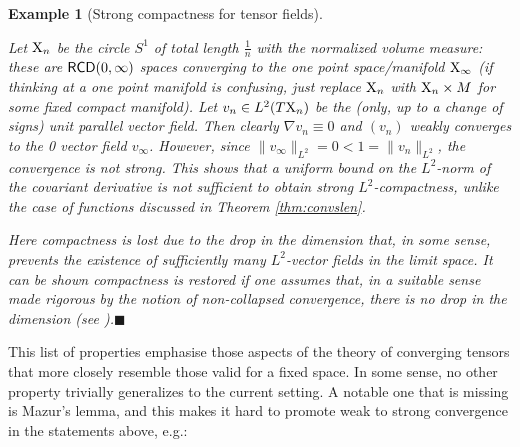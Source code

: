 \documentclass[11pt]{article}
\numberwithin{equation}{section}
\newtheorem{example}[theorem]{Example}
\newcommand{\X}{{\rm X}}
\newcommand{\RCD}{{\sf RCD}}
\newcommand{\fr}{\penalty-20\null\hfill$\blacksquare$}         %
\begin{document}
\begin{example}[Strong compactness for tensor fields]\label{eq:compvect}{\rm Let $\X_n$ be the circle $S^1$ of total length $\tfrac1n$ with the normalized volume measure: these are $\RCD(0,\infty)$ spaces converging to the one point space/manifold $\X_\infty$ (if thinking at a one point manifold is confusing, just replace $\X_n$ with $\X_n\times M$ for some fixed compact manifold). Let $v_n\in L^2(T\X_n)$ be the (only, up to a change of signs) unit parallel vector field. Then clearly $\nabla v_n\equiv 0$ and $(v_n)$ weakly converges to the 0 vector field $v_\infty$. However, since $\|v_\infty\|_{L^2}=0<1=\|v_n\|_{L^2}$, the convergence is not strong. This shows that a uniform bound on the $L^2$-norm of the covariant derivative is not sufficient to obtain strong $L^2$-compactness, unlike the case of functions discussed in Theorem \ref{thm:convslen}.

Here compactness is lost due to the drop in the dimension that, in some sense, prevents the existence of sufficiently many $L^2$-vector fields in the limit space. It can be shown compactness is restored if one assumes that, in a suitable sense made rigorous by the notion of non-collapsed convergence, there is no drop in the dimension (see \cite[Corollary 6.16]{Honda14}).\fr
}\end{example}
This list of properties emphasise those aspects of the theory of converging tensors that more closely resemble those valid for a fixed space. In some sense, no other property trivially generalizes to the current setting. A notable one that  is  missing  is Mazur's lemma, and this makes it hard to  promote weak to strong convergence in the statements above, e.g.:
\end{document}
